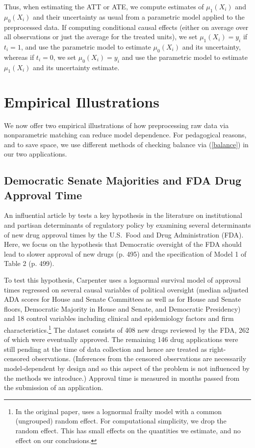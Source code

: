 \documentclass[11pt,titlepage]{article}
\begin{document}
Thus, when estimating the ATT or ATE, we compute estimates of
$\mu_1(X_i)$ and $\mu_0(X_i)$ and their uncertainty as usual from a
parametric model applied to the preprocessed data.  If computing
conditional causal effects (either on average over all observations or
just the average for the treated units), we set $\mu_1(X_i)=y_i$ if
$t_i=1$, and use the parametric model to estimate $\mu_0(X_i)$ and its
uncertainty, whereas if $t_i=0$, we set $\mu_0(X_i)=y_i$ and use the
parametric model to estimate $\mu_1(X_i)$ and its uncertainty
estimate.

\section{Empirical Illustrations}\label{s:emp}

We now offer two empirical illustrations of how preprocessing raw data
via nonparametric matching can reduce model dependence.  For
pedagogical reasons, and to save space, we use different methods of
checking balance via (\ref{balance}) in our two applications.

\subsection{Democratic Senate Majorities and FDA Drug Approval
  Time}\label{s:carp}

An influential article by \citet{Carpenter02} tests a key hypothesis
in the literature on institutional and partisan determinants of
regulatory policy by examining several determinants of new drug
approval times by the U.S.\ Food and Drug Administration (FDA).  Here,
we focus on the hypothesis that Democratic oversight of the FDA should
lead to slower approval of new drugs (p. 495) and the specification of
Model 1 of Table 2 (p. 499).

To test this hypothesis, Carpenter uses a lognormal survival model of
approval times regressed on several causal variables of political
oversight (median adjusted ADA scores for House and Senate Committees
as well as for House and Senate floors, Democratic Majority in House
and Senate, and Democratic Presidency) and 18 control variables
including clinical and epidemiology factors and firm
characteristics.\footnote{In the original paper, \citet{Carpenter02}
  uses a lognormal frailty model with a common (ungrouped) random
  effect.  For computational simplicity, we drop the random effect.
  This has small effects on the quantities we estimate, and no effect
  on our conclusions.}  The dataset consists of 408 new drugs reviewed
by the FDA, 262 of which were eventually approved.  The remaining 146
drug applications were still pending at the time of data collection
and hence are treated as right-censored observations.  (Inferences
from the censored observations are necessarily model-dependent by
design and so this aspect of the problem is not influenced by the
methods we introduce.)  Approval time is measured in months passed
from the submission of an application.
\end{document}

